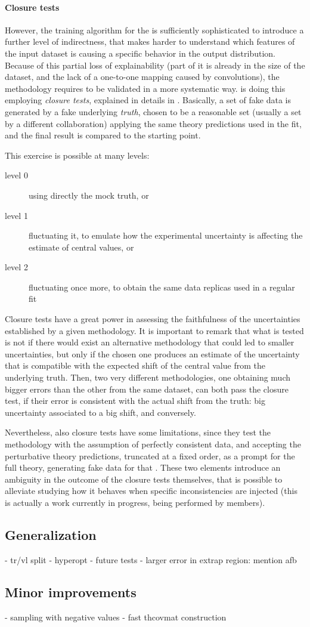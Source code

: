 \paragraph{Closure tests} However, the training algorithm for the \nn is
sufficiently sophisticated to introduce a further level of indirectness, that
makes harder to understand which features of the input dataset is causing a
specific behavior in the output distribution.
%
Because of this partial loss of explainability (part of it is already in the
size of the dataset, and the lack of a one-to-one mapping caused by
convolutions), the methodology requires to be validated in a more systematic
way.
%
\nnpdf is doing this employing \textit{closure tests}, explained in details in
\cite{DelDebbio:2021whr}.
%
Basically, a set of fake data is generated by a fake underlying \textit{truth},
chosen to be a reasonable \pdf set (usually a set by a different collaboration)
applying the same theory predictions used in the fit, and the final result is
compared to the starting point.

This exercise is possible at many levels: 
\begin{description}
  \item[level 0] using directly the mock truth, or
  \item[level 1] fluctuating it, to emulate how the experimental uncertainty is
    affecting the estimate of central values, or
  \item[level 2] fluctuating once more, to obtain the same data replicas used
    in a regular fit
\end{description}

Closure tests have a great power in assessing the faithfulness of the
uncertainties established by a given methodology.
%
It is important to remark that what is tested is not if there would exist an
alternative methodology that could led to smaller uncertainties, but only if
the chosen one produces an estimate of the uncertainty that is compatible with
the expected shift of the central value from the underlying truth.
%
Then, two very different methodologies, one obtaining much bigger errors than
the other from the same dataset, can both pass the closure test, if their error
is consistent with the actual shift from the truth: big uncertainty associated
to a big shift, and conversely.

Nevertheless, also closure tests have some limitations, since they test the
methodology with the assumption of perfectly consistent data, and accepting
the perturbative theory predictions, truncated at a fixed order, as a prompt
for the full theory, generating fake data for that \pdf.
%
These two elements introduce an ambiguity in the outcome of the closure tests
themselves, that is possible to alleviate studying how it behaves when specific
inconsistencies are injected (this is actually a work currently in progress,
being performed by \nnpdf members).

\subsection{Generalization}

- tr/vl split
- hyperopt
- future tests
- larger error in extrap region: mention afb

\subsection{Minor improvements}

- sampling with negative values
- fast thcovmat construction
